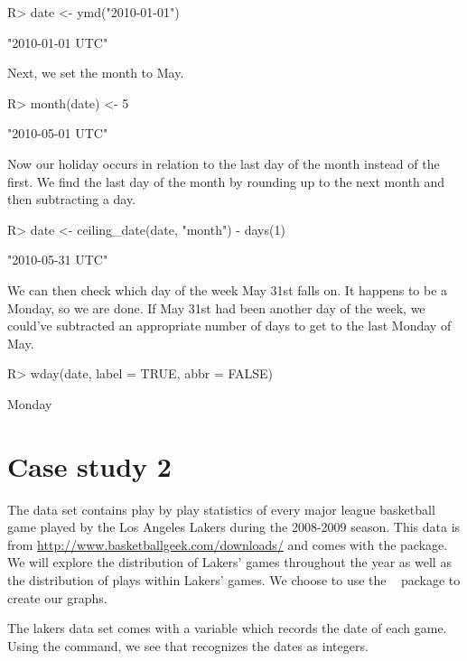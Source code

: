 \documentclass[article]{jss}
\begin{document}
\begin{CodeInput}
R> date <- ymd("2010-01-01")
\end{CodeInput}
\begin{CodeOutput}
[1] "2010-01-01 UTC"
\end{CodeOutput}

Next, we set the month to May.

\begin{CodeInput}
R> month(date) <- 5
\end{CodeInput}
\begin{CodeOutput}
[1] "2010-05-01 UTC"
\end{CodeOutput}

Now our holiday occurs in relation to the last day of the month instead of the first. We find the last day of the month by rounding up to the next month and then subtracting a day.

\begin{CodeInput}
R> date <- ceiling_date(date, "month") - days(1)
\end{CodeInput}
\begin{CodeOutput}
[1] "2010-05-31 UTC"
\end{CodeOutput}

We can then check which day of the week May 31st falls on. It happens to be a Monday, so we are done. If May 31st had been another day of the week, we could've subtracted an appropriate number of days to get to the last Monday of May.

\begin{CodeInput}
R> wday(date, label = TRUE, abbr = FALSE)
\end{CodeInput}
\begin{CodeOutput}
[1] Monday
\end{CodeOutput}


\section{Case study 2}
The  data set contains play by play statistics of every major league basketball game played by the Los Angeles Lakers during the 2008-2009 season. This data is from \url{http://www.basketballgeek.com/downloads/} \citep{bball} and comes with the  package. We will explore the distribution of Lakers' games throughout the year as well as the distribution of plays within Lakers' games. We choose to use the  ~\citep{ggplot2} package to create our graphs.

The lakers data set comes with a  variable which records the date of each game. Using the  command, we see that  recognizes the dates as integers.
\end{document}
